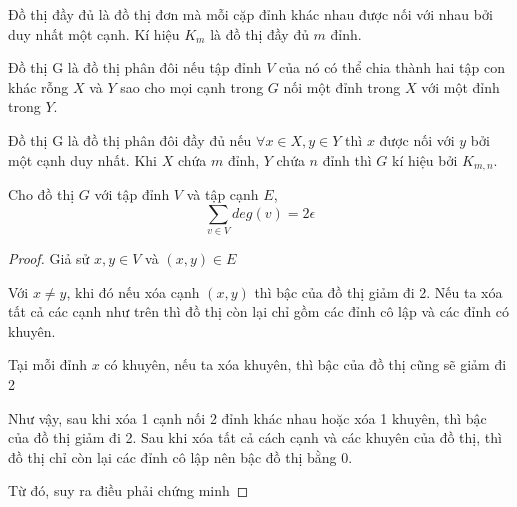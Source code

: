 \begin{definition}
    Đồ thị đầy đủ là đồ thị đơn mà mỗi cặp đỉnh khác nhau được nối với nhau bởi duy nhất một cạnh. Kí hiệu $K_m$ là đồ thị đầy đủ $m$ đỉnh.

    Đồ thị G là đồ thị phân đôi nếu tập đỉnh $V$ của nó có thể chia thành hai tập con khác rỗng $X$ và $Y$ sao cho mọi cạnh trong $G$ nối một đỉnh trong $X$ với một đỉnh trong $Y$.

    Đồ thị G là đồ thị phân đôi đầy đủ nếu $\forall x \in X, y \in Y$ thì $x$ được nối với $y$ bởi một cạnh duy nhất.
    Khi $X$ chứa $m$ đỉnh, $Y$ chứa $n$ đỉnh thì $G$ kí hiệu bởi $K_{m,n}$.
    \begin{center}
        \hspace{2cm}
    \end{center}
\end{definition}
\begin{theorem}
    \label{thr:v2e}
    Cho đồ thị $G$ với tập đỉnh $V$ và tập cạnh $E$, $$\sum_{v\in V}deg(v) = 2\epsilon$$
\end{theorem}
\begin{proof}

    Giả sử $x,y \in V$ và $(x,y) \in E$

    \indent Với $x \neq y$, khi đó nếu xóa cạnh $(x,y)$ thì bậc của đồ thị giảm đi 2. Nếu ta xóa tất cả các cạnh như trên thì đồ thị còn lại chỉ gồm các đỉnh cô lập và các đỉnh có khuyên.

    Tại mỗi đỉnh $x$ có khuyên, nếu ta xóa khuyên, thì bậc của đồ thị cũng sẽ giảm đi 2

    Như vậy, sau khi xóa 1 cạnh nối 2 đỉnh khác nhau hoặc xóa 1 khuyên, thì bậc của đồ thị giảm đi 2. Sau khi xóa tất cả cách cạnh và các khuyên của đồ thị, thì đồ thị chỉ còn lại các đỉnh cô lập nên bậc đồ thị bằng 0.

    Từ đó, suy ra điều phải chứng minh
\end{proof}

